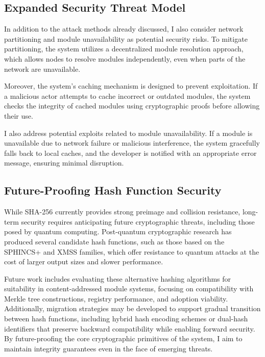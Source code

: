 \documentclass[sigplan,screen]{acmart}
\begin{document}
\subsection{Expanded Security Threat Model}

In addition to the attack methods already discussed, I also consider network partitioning and module unavailability as potential security risks. To mitigate partitioning, the system utilizes a decentralized module resolution approach, which allows nodes to resolve modules independently, even when parts of the network are unavailable.

Moreover, the system's caching mechanism is designed to prevent exploitation. If a malicious actor attempts to cache incorrect or outdated modules, the system checks the integrity of cached modules using cryptographic proofs before allowing their use.

I also address potential exploits related to module unavailability. If a module is unavailable due to network failure or malicious interference, the system gracefully falls back to local caches, and the developer is notified with an appropriate error message, ensuring minimal disruption.

\subsection{Future-Proofing Hash Function Security}
\label{sec:security-future}

While SHA-256 currently provides strong preimage and collision resistance, long-term security requires anticipating future cryptographic threats, including those posed by quantum computing. Post-quantum cryptographic research has produced several candidate hash functions, such as those based on the SPHINCS+ and XMSS families, which offer resistance to quantum attacks at the cost of larger output sizes and slower performance.

Future work includes evaluating these alternative hashing algorithms for suitability in content-addressed module systems, focusing on compatibility with Merkle tree constructions, registry performance, and adoption viability. Additionally, migration strategies may be developed to support gradual transition between hash functions, including hybrid hash encoding schemes or dual-hash identifiers that preserve backward compatibility while enabling forward security. By future-proofing the core cryptographic primitives of the system, I aim to maintain integrity guarantees even in the face of emerging threats.
\end{document}
